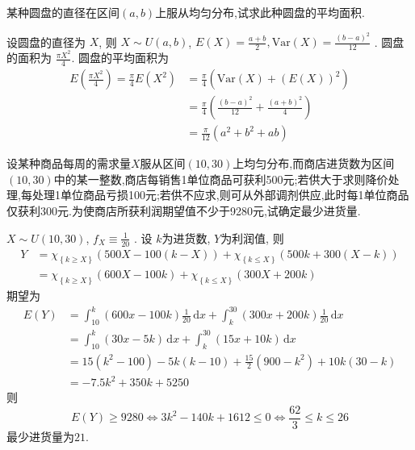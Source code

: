 \documentclass[../main.tex]{subfiles}
\begin{document}
\begin{exercise}{}{}
某种圆盘的直径在区间$(a,b)$上服从均匀分布,试求此种圆盘的平均面积.
\end{exercise}

\begin{solution}
      设圆盘的直径为 \(  X  \), 则 \(  X\sim U\left( a,b \right)   \), \(  E\left( X \right)= \frac{a+ b }{2 }, \mathrm{Var}\left( X \right)= \frac{\left( b-a \right)^{2}  }{12 }      \)  . 圆盘的面积为 \(  \frac{  \pi  X^{2}}{4 }   \).   圆盘的平均面积为 \[
    \begin{aligned}
    E\left( \frac{ \pi X^{2} }{4 }  \right)= \frac{ \pi  }{4 }E\left( X^{2} \right)    &= \frac{ \pi  }{4 }\left( \mathrm{Var}\left( X \right)+ \left( E\left( X \right)  \right)^{2}   \right)\\ 
     &=  \frac{ \pi  }{4 }\left( \frac{\left( b-a \right)^{2}  }{12 }+ \frac{\left( a+ b \right)^{2}  }{4 }   \right) \\ 
      & = \frac{ \pi  }{12 }\left( a^{2}+ b^{2}+ ab \right)   
    \end{aligned}
    \]
\end{solution}

\begin{exercise}{}{}
设某种商品每周的需求量$X$服从区间$(10,30)$上均匀分布,而商店进货数为区间$(10,30)$中的某一整数,商店每销售1单位商品可获利500元;若供大于求则降价处理,每处理1单位商品亏损100元;若供不应求,则可从外部调剂供应,此时每1单位商品仅获利300元.为使商店所获利润期望值不少于9280元,试确定最少进货量.
\end{exercise}
\begin{solution}
          \(  X \sim U\left( 10,30 \right)   \), \(  f_{X}\equiv \frac{1 }{20 }   \)  . 设 \(  k \)为进货数,   \(  Y  \)为利润值, 则 \[
   \begin{aligned}
    Y&= \chi _{\left\{ k\ge X \right\}}\left(  500X-100\left( k-X \right)  \right)+ \chi _{\left\{ k\le X \right\}}\left( 500k+ 300\left( X-k \right)  \right)   \\ 
     &= \chi _{\left\{ k\ge X \right\}}\left( 600X-100k \right)+ \chi _{\left\{ k\le X \right\}}\left( 300X+ 200k \right)  
   \end{aligned}
    \]期望为 \[
\begin{aligned}
    E\left( Y \right)&= \int_{10}^{k} \left( 600x-100k \right)\frac{1 }{20 }\,\mathrm{d} x+ \int_{k}^{30}\left( 300x+ 200k \right)   \frac{1 }{20 }\,\mathrm{d} x \\ 
     &= \int_{10}^{k}\left( 30x-5k \right)\,\mathrm{d} x+ \int_{k}^{30}\left( 15x+ 10k \right)\,\mathrm{d} x\\ 
      &= 15\left( k^{2}-100 \right)-5k\left( k-10 \right)+ \frac{15 }{2 }\left( 900-k^{2} \right)+ 10k\left( 30-k \right)       \\ 
       &= -7.5k^{2}+ 350k+ 5250
\end{aligned}    \] 
则 \[
E\left( Y \right)\ge 9280\iff 3k^{2}-140k+ 1612\le 0\iff \frac{62 }{3 } \le k\le 26
\]最少进货量为\(  21  \). 
\end{solution}
\end{document}
